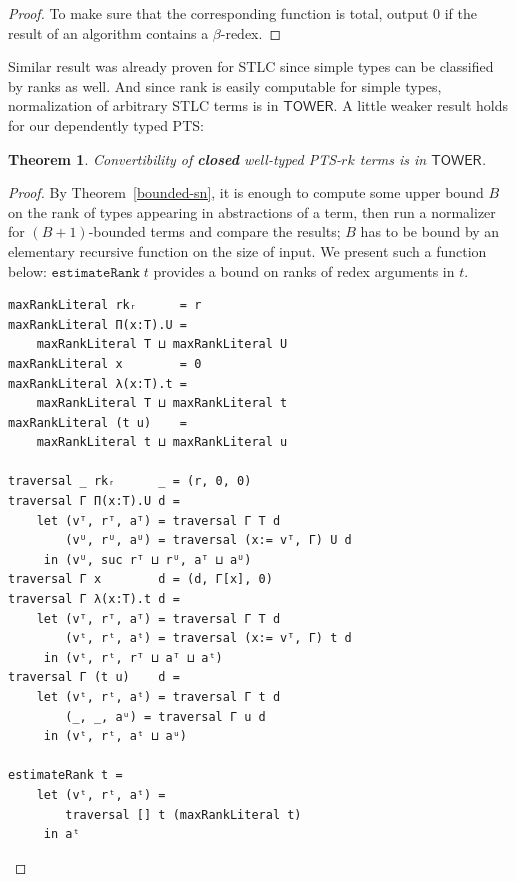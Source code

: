 \documentclass{article}
\newtheorem{theorem}{Theorem}
\theoremstyle{definition}
\theoremstyle{remark}
\begin{document}
\begin{proof}
To make sure that the corresponding function is total,
output $0$ if the result of an algorithm contains a
$\beta$-redex.
\end{proof}

Similar result was already proven for STLC
\cite{schwichtenberg1991upper,beckmann2001exact} since
simple types can be classified by ranks as well. And
since rank is easily computable for simple types,
normalization of arbitrary STLC terms is in
$\mathsf{TOWER}$. A little weaker result holds for our
dependently typed PTS:

\begin{theorem}\label{tower-convertibility}
    Convertibility of \textbf{closed} well-typed
    PTS-$rk$ terms is in $\mathsf{TOWER}$.
\end{theorem}
\begin{proof}
    By Theorem~\ref{bounded-sn}, it is enough to
    compute some upper bound $B$ on the rank of types
    appearing in abstractions of a term, then run a
    normalizer for $(B+1)$-bounded terms and compare
    the results; $B$ has to be bound by an elementary
    recursive function on the size of input. We present
    such a function below: $\mathtt{estimateRank}\;t$
    provides a bound on ranks of redex arguments in
    $t$.

    \begin{verbatim}
maxRankLiteral rkᵣ      = r
maxRankLiteral Π(x:T).U =
    maxRankLiteral T ⊔ maxRankLiteral U
maxRankLiteral x        = 0
maxRankLiteral λ(x:T).t =
    maxRankLiteral T ⊔ maxRankLiteral t
maxRankLiteral (t u)    =
    maxRankLiteral t ⊔ maxRankLiteral u

traversal _ rkᵣ      _ = (r, 0, 0)
traversal Γ Π(x:T).U d =
    let (vᵀ, rᵀ, aᵀ) = traversal Γ T d
        (vᵁ, rᵁ, aᵁ) = traversal (x:= vᵀ, Γ) U d
     in (vᵁ, suc rᵀ ⊔ rᵁ, aᵀ ⊔ aᵁ)
traversal Γ x        d = (d, Γ[x], 0)
traversal Γ λ(x:T).t d =
    let (vᵀ, rᵀ, aᵀ) = traversal Γ T d
        (vᵗ, rᵗ, aᵗ) = traversal (x:= vᵀ, Γ) t d
     in (vᵗ, rᵗ, rᵀ ⊔ aᵀ ⊔ aᵗ)
traversal Γ (t u)    d =
    let (vᵗ, rᵗ, aᵗ) = traversal Γ t d
        (_, _, aᵘ) = traversal Γ u d
     in (vᵗ, rᵗ, aᵗ ⊔ aᵘ)

estimateRank t =
    let (vᵗ, rᵗ, aᵗ) =
        traversal [] t (maxRankLiteral t)
     in aᵗ
    \end{verbatim}


\end{proof}
\end{document}
